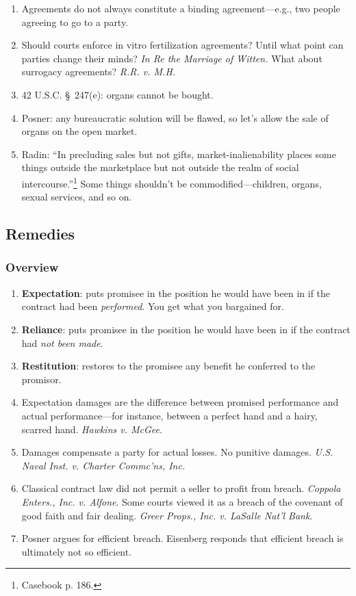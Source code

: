 \begin{enumerate}
    \item Agreements do not always constitute a binding agreement---e.g., two 
    people agreeing to go to a party.
    \item Should courts enforce in vitro fertilization agreements? Until what 
    point can parties change their minds? \emph{In Re the Marriage of Witten.} 
    What about surrogacy agreements? \emph{R.R. v. M.H.}
    \item 42 U.S.C. \S\ 247(e): organs cannot be bought.
    \item Posner: any bureaucratic solution will be flawed, so let's allow the 
    sale of organs on the open market.
    \item Radin: ``In precluding sales but not gifts, market-inalienability 
    places some things outside the marketplace but not outside the realm of 
    social intercourse.''\footnote{Casebook p. 186.} Some things shouldn't be 
    commodified---children, organs, sexual services, and so on.
\end{enumerate}

\subsection{Remedies}

\subsubsection{Overview}

\begin{enumerate}
    \item \textbf{Expectation}: puts promisee in the position he would have 
    been in if the contract had been \emph{performed}. You get what you 
    bargained for.
    \item \textbf{Reliance}: puts promisee in the position he would have been 
    in 
    if the contract had \emph{not been made}.
    \item \textbf{Restitution}: restores to the promisee any benefit he 
    conferred to the promisor.
    \item Expectation damages are the difference between promised performance 
    and actual performance---for instance, between a perfect hand and a hairy, 
    scarred hand. \emph{Hawkins v. McGee}.
    \item Damages compensate a party for actual losses. No punitive damages. 
    \emph{U.S. Naval Inst. v.  Charter Commc'ns, Inc.}
    \item Classical contract law did not permit a seller to profit from 
    breach. \emph{Coppola Enters., Inc. v. Alfone}. Some courts viewed it as a 
    breach of the covenant of good faith and fair dealing. \emph{Greer Props., 
    Inc. v. LaSalle Nat'l Bank}.
    \item Posner argues for efficient breach. Eisenberg responds that 
    efficient breach is ultimately not so efficient.
\end{enumerate}

